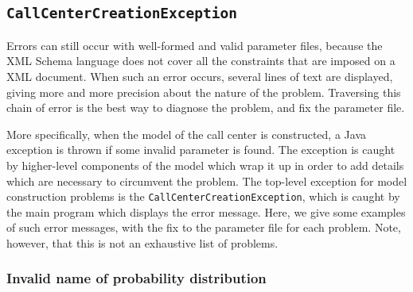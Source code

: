 \subsection{\texttt{CallCenterCreationException}}

Errors can still occur with well-formed and valid parameter files,
because the XML Schema language does not cover all the constraints
that are imposed on a XML document.
When such an error occurs, several lines of text are displayed, giving
more and more precision about the nature of the problem.
Traversing this chain of error is the best way to diagnose the
problem, and fix the parameter file.

More specifically,
when the model of the call center is constructed, a Java exception
is thrown if some invalid parameter is found.
The exception is caught by higher-level components of the model which
wrap it up in order to add details which are necessary to circumvent
the problem.
The top-level exception for model construction problems is the
\texttt{Call\-Center\-Creation\-Exception}, which is caught by the main
program which displays the error message.
Here, we give some examples of such error messages, with the fix to
the parameter file for each problem.
Note, however, that this is not an exhaustive list of problems.

\subsubsection{Invalid name of probability distribution}

